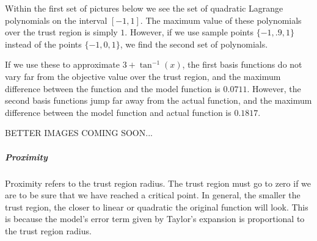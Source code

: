 \documentclass{article}
\let\oldref\ref
\renewcommand{\ref}[1]{(\oldref{#1})}
\begin{document}
Within the first set of pictures below we see the set of quadratic Lagrange polynomials on the interval $[-1,1]$.
The maximum value of these polynomials over the trust region is simply $1$.
However, if we use sample points $\{-1, .9, 1\}$ instead of the points $\{-1, 0, 1\}$,
we find the second set of polynomials.

If we use these to approximate $3 + \tan^{-1}(x)$, the first basis functions do not vary far from the objective value over the trust region, and the maximum difference between the function and the model function is $0.0711$.
However, the second basis functions jump far away from the actual function, and the maximum difference between the model function and actual function is 
$0.1817$.


BETTER IMAGES COMING SOON...





\subparagraph{Proximity}

Proximity refers to the trust region radius.
The trust region must go to zero if we are to be sure that we have reached a critical point.
In general, the smaller the trust region, the closer to linear or quadratic the original function will look.
This is because the model's error term given by Taylor's expansion is proportional to the trust region radius.




%
\end{document}
